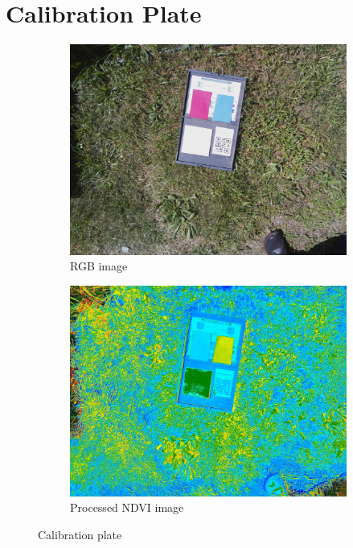 \section{Calibration Plate}

\begin{figure}[H]
\begin{subfigure}{0.5\textwidth}
\centering
\includegraphics[scale=0.17]{images/rgb_cal.jpg}
\caption{RGB image}
\end{subfigure}
\begin{subfigure}{0.5\textwidth}
\centering
\includegraphics[scale=0.17]{images/ndvi_cal.jpg}
\caption{Processed NDVI image}
\end{subfigure}
\caption{Calibration plate}
\label{fig:cal_plate}
\end{figure}